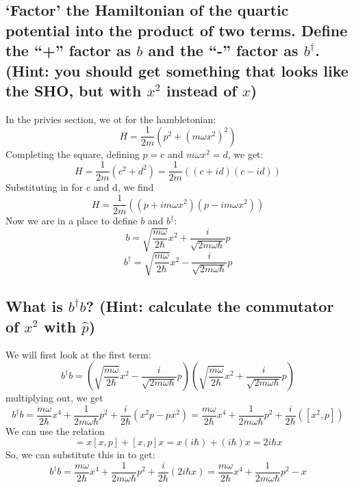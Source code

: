 \documentclass[12pt]{article}
\begin{document}
\subsection{`Factor' the Hamiltonian of the quartic potential into the product of two terms. Define the “+” factor as \( b \) and the “-” factor as \( b^\dagger \). (Hint: you should get something that looks like the SHO, but with \( x^2 \) instead of \( x \))}
In the privies section, we ot for the hambletonian:
\begin{equation}
    H = \frac{1}{2m} \left(p^{2} + \left(m \omega x^{2}\right)^{2}\right)
\end{equation}
Completing the square, defining $p=c$ and $m \omega x^{2}=d$, we get:
\begin{equation}
    H = \frac{1}{2m} \left(c^{2} + d^{2}\right) = \frac{1}{2m} \left(\left(c+id\right)\left(c-id\right)\right)
\end{equation}
Substituting in for c and d, we find
\begin{equation}
    H = \frac{1}{2m} \left(\left(p+im \omega x^{2}\right)\left(p-im \omega x^{2}\right)\right)
\end{equation}
Now we are in a place to define $b$ and $b^{\dagger}$:
\begin{equation}
    b = \sqrt{\frac{m\omega}{2\hbar}}x^2 + \frac{i}{\sqrt{2m\omega\hbar}}p
\end{equation}
\begin{equation}
    b^{\dagger} = \sqrt{\frac{m\omega}{2\hbar}}x^2 - \frac{i}{\sqrt{2m\omega\hbar}}p
\end{equation}
\subsection{What is \( b^\dagger b \)? (Hint: calculate the commutator of \( x^2 \) with \( \hat{p} \))}
We will first look at the first term:
\begin{equation}
    b^\dagger b = \left(\sqrt{\frac{m\omega}{2\hbar}}x^2 - \frac{i}{\sqrt{2m\omega\hbar}}p\right)\left(\sqrt{\frac{m\omega}{2\hbar}}x^2 + \frac{i}{\sqrt{2m\omega\hbar}}p\right)
\end{equation}
multiplying out, we get
\begin{equation}
    b^\dagger b = \frac{m\omega}{2\hbar}x^4 + \frac{1}{2m\omega\hbar}p^2 + \frac{i}{2\hbar}\left(x^{2}p- px^{2}\right) = \frac{m\omega}{2\hbar}x^4 + \frac{1}{2m\omega\hbar}p^2 + \frac{i}{2\hbar}\left([x^{2},p]\right)
\end{equation}
We can use the relation
\begin{equation}
    [x^{2},p] = x[x,p] + [x,p]x = x\left(i\hbar\right) + \left(i\hbar\right)x = 2i\hbar x
\end{equation}
So, we can substitute this in to get:
\begin{equation}
    b^\dagger b = \frac{m\omega}{2\hbar}x^4 + \frac{1}{2m\omega\hbar}p^2 + \frac{i}{2\hbar}\left(2i\hbar x\right) \boxed{= \frac{m\omega}{2\hbar}x^4 + \frac{1}{2m\omega\hbar}p^2 - x}
\end{equation}
\end{document}
